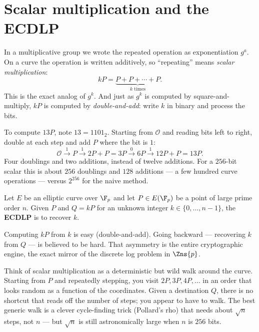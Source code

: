 \section{Scalar multiplication and the ECDLP}
\label{ch21:ecdlp}

In a multiplicative group we wrote the repeated operation as exponentiation $g^a$. On a
curve the operation is written additively, so ``repeating'' means \emph{scalar
multiplication}:
\[
kP = \underbrace{P + P + \cdots + P}_{k \text{ times}}.
\]
This is the exact analog of $g^k$. And just as $g^k$ is computed by square-and-multiply,
$kP$ is computed by \emph{double-and-add}: write $k$ in binary and process the bits.

\begin{example}
\label{ch21:dbladd}
To compute $13P$, note $13 = 1101_2$. Starting from $\mathcal{O}$ and reading bits left
to right, double at each step and add $P$ where the bit is $1$:
\[
\mathcal{O} \xrightarrow{\,1\,} P \xrightarrow{\,1\,} 2P{+}P{=}3P
\xrightarrow{\,0\,} 6P \xrightarrow{\,1\,} 12P{+}P{=}13P.
\]
Four doublings and two additions, instead of twelve additions. For a $256$-bit scalar
this is about $256$ doublings and $128$ additions --- a few hundred curve operations ---
versus $2^{256}$ for the naive method.
\end{example}

\begin{definition}
\label{ch21:ecdlp-def}
Let $E$ be an elliptic curve over $\F_p$ and let $P \in E(\F_p)$ be a point of large
prime order $n$. Given $P$ and $Q = kP$ for an unknown integer $k \in \{0,\dots,n-1\}$,
the \textbf{ECDLP} is to recover $k$.
\end{definition}

Computing $kP$ from $k$ is easy (double-and-add). Going backward --- recovering $k$ from
$Q$ --- is believed to be hard. That asymmetry is the entire cryptographic engine, the
exact mirror of the discrete log problem in $\Zns{p}$.

\begin{intuitionbox}
Think of scalar multiplication as a deterministic but wild walk around the curve.
Starting from $P$ and repeatedly stepping, you visit $2P, 3P, 4P, \dots$ in an order
that looks random as a function of the coordinates. Given a destination $Q$, there is no
shortcut that reads off the number of steps; you appear to have to walk. The best
generic walk is a clever cycle-finding trick (Pollard's rho) that needs about
$\sqrt{n}$ steps, not $n$ --- but $\sqrt{n}$ is still astronomically large when $n$ is
$256$ bits.
\end{intuitionbox}

